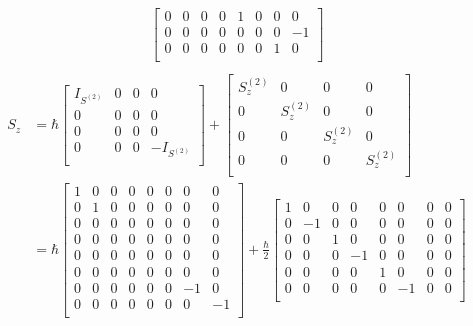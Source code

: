 \begin{example}
\begin{equation}
\begin{split}
\begin{bmatrix}
				0 & 0 & 0 & 0 & 1 & 0 & 0 & 0 \\
				0 & 0 & 0 & 0 & 0 & 0 & 0 & -1 \\
				0 & 0 & 0 & 0 & 0 & 0 & 1 & 0 \\
			\end{bmatrix} \\
		\end{split}
	\end{equation} 
	\begin{equation}
		\begin{split}
			S_z&=\hbar\begin{bmatrix}
				I_{S^{(2)}} & 0 & 0 & 0 \\
				0 & 0 & 0 & 0 \\
				0 & 0 & 0 & 0 \\
				0 & 0 & 0 & -I_{S^{(2)}} \\
			\end{bmatrix}+\begin{bmatrix}
				S^{(2)}_z & 0 & 0 & 0 \\
				0 & S^{(2)}_z & 0 & 0 \\
				0 & 0 & S^{(2)}_z & 0 \\
				0 & 0 & 0 & S^{(2)}_z \\
			\end{bmatrix} \\
			&=\hbar\begin{bmatrix}
				1 & 0 & 0 & 0 & 0 & 0 & 0 & 0 \\
				0 & 1 & 0 & 0 & 0 & 0 & 0 & 0 \\
				0 & 0 & 0 & 0 & 0 & 0 & 0 & 0 \\
				0 & 0 & 0 & 0 & 0 & 0 & 0 & 0 \\
				0 & 0 & 0 & 0 & 0 & 0 & 0 & 0 \\
				0 & 0 & 0 & 0 & 0 & 0 & 0 & 0 \\
				0 & 0 & 0 & 0 & 0 & 0 & -1 & 0 \\
				0 & 0 & 0 & 0 & 0 & 0 & 0 & -1 \\
			\end{bmatrix} +\frac{\hbar}{2}\begin{bmatrix}
				1 & 0 & 0 & 0 & 0 & 0 & 0 & 0 \\
				0 & -1 & 0 & 0 & 0 & 0 & 0 & 0 \\
				0 & 0 & 1 & 0 & 0 & 0 & 0 & 0 \\
				0 & 0 & 0 & -1 & 0 & 0 & 0 & 0 \\
				0 & 0 & 0 & 0 & 1 & 0 & 0 & 0 \\
				0 & 0 & 0 & 0 & 0 & -1 & 0 & 0 \\

\end{bmatrix}
\end{split}
\end{equation}
\end{example}
